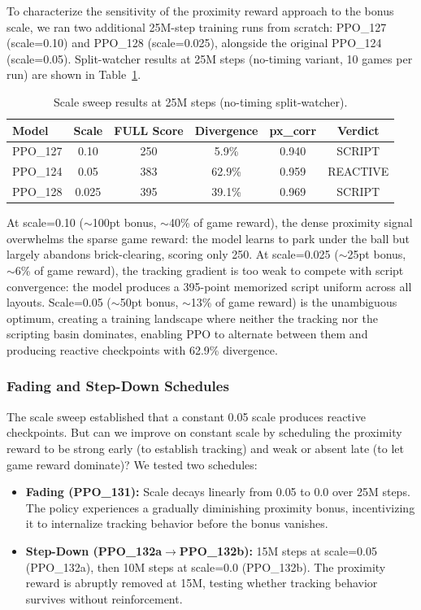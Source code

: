 \documentclass[11pt]{article}
\begin{document}
To characterize the sensitivity of the proximity reward approach to the bonus
scale, we ran two additional 25M-step training runs from scratch: PPO\_127
(scale=0.10) and PPO\_128 (scale=0.025), alongside the original PPO\_124
(scale=0.05). Split-watcher results at 25M steps (no-timing variant, 10
games per run) are shown in Table~\ref{tab:scale}.

\begin{table}[h]
\centering
\begin{tabular}{lccccc}
\toprule
\textbf{Model} & \textbf{Scale} & \textbf{FULL Score} & \textbf{Divergence} &
\textbf{px\_corr} & \textbf{Verdict} \\
\midrule
PPO\_127 & 0.10   & 250  & 5.9\%  & 0.940 & SCRIPT \\
PPO\_124 & 0.05   & 383  & 62.9\% & 0.959 & REACTIVE \\
PPO\_128 & 0.025  & 395  & 39.1\% & 0.969 & SCRIPT \\
\bottomrule
\end{tabular}
\caption{Scale sweep results at 25M steps (no-timing split-watcher).}
\label{tab:scale}
\end{table}

At scale=0.10 ($\sim$100pt bonus, $\sim$40\% of game reward), the dense
proximity signal overwhelms the sparse game reward: the model learns to park
under the ball but largely abandons brick-clearing, scoring only 250. At
scale=0.025 ($\sim$25pt bonus, $\sim$6\% of game reward), the tracking
gradient is too weak to compete with script convergence: the model produces a
395-point memorized script uniform across all layouts. Scale=0.05
($\sim$50pt bonus, $\sim$13\% of game reward) is the unambiguous optimum,
creating a training landscape where neither the tracking nor the scripting
basin dominates, enabling PPO to alternate between them and producing
reactive checkpoints with 62.9\% divergence.

\subsubsection{Fading and Step-Down Schedules}
\label{sec:fading}

The scale sweep established that a constant 0.05 scale produces reactive
checkpoints. But can we improve on constant scale by scheduling the proximity
reward to be strong early (to establish tracking) and weak or absent late (to
let game reward dominate)? We tested two schedules:

\begin{itemize}
    \item \textbf{Fading (PPO\_131):} Scale decays linearly from 0.05 to 0.0
    over 25M steps. The policy experiences a gradually diminishing proximity
    bonus, incentivizing it to internalize tracking behavior before the bonus
    vanishes.

    \item \textbf{Step-Down (PPO\_132a$\rightarrow$PPO\_132b):} 15M steps at
    scale=0.05 (PPO\_132a), then 10M steps at scale=0.0 (PPO\_132b). The
    proximity reward is abruptly removed at 15M, testing whether tracking
    behavior survives without reinforcement.
\end{itemize}
\end{document}
